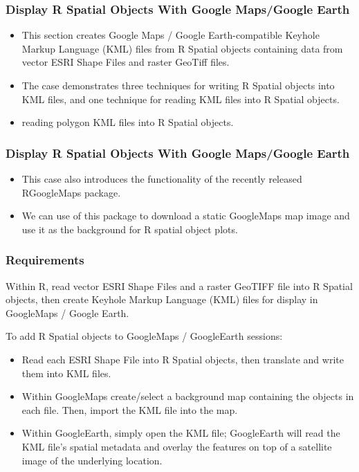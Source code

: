 \documentclass{beamer}
\begin{document}
\begin{frame}
\frametitle{Display R Spatial Objects With Google Maps/Google Earth}
\begin{itemize}
\item This section creates Google Maps / Google Earth-compatible Keyhole Markup Language (KML) files from R Spatial objects containing data from 
vector ESRI Shape Files and raster GeoTiff files.
\item  The case demonstrates three techniques for writing R Spatial objects into KML files, and one technique for reading KML files into R Spatial objects.
\item reading polygon KML files into R Spatial objects.
\end{itemize}
\end{frame}
\begin{frame}
\frametitle{Display R Spatial Objects With Google Maps/Google Earth}
\begin{itemize}
\item This case also introduces the functionality of the recently released RGoogleMaps package. 
\item We can use of this package to download a static GoogleMaps map image and use it as the background for R spatial object plots. 
\end{itemize}

\end{frame}
\begin{frame}
\frametitle{Requirements}
Within R, read vector ESRI Shape Files and a raster GeoTIFF file into R Spatial objects, then create Keyhole Markup Language (KML) files for display in GoogleMaps / Google Earth.
\end{frame}
\begin{frame}

To add R Spatial objects to GoogleMaps / GoogleEarth sessions:
\begin{itemize}
\item Read each ESRI Shape File into R Spatial objects, then translate and write them into KML files.
\item Within GoogleMaps create/select a background map containing the objects in each file. Then, import the KML file into the map. 
\item Within GoogleEarth, simply open the KML file; GoogleEarth will read the KML file's spatial metadata and overlay the features on top of a satellite image of the underlying location.
\end{itemize}
\end{frame}
\end{document}
